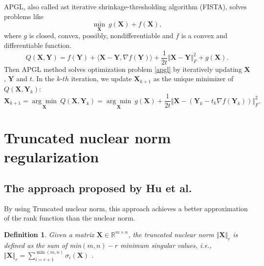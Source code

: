 \documentclass{article}
\newtheorem{definition}{Definition}[section]
\begin{document}
{APGL, also called ast iterative shrinkage-thresholding algorithm (FISTA), solves problems like
\begin{equation}
    \underset{\mathbf X}{\min} \ g(\mathbf X)+f(\mathbf X),
    \label{apgl}
\end{equation}
where $g$ is closed, convex, possibly, nondifferentiable and $f$ is a convex and differentiable function. 
\begin{equation}
    Q(\mathbf X,\mathbf Y) = f(\mathbf Y)+\langle \mathbf X - \mathbf Y, \nabla f(\mathbf Y) \rangle + \frac{1}{2t}\Vert \mathbf X - \mathbf Y \Vert_F^2 +g(\mathbf X).
\end{equation}
Then APGL method solves optimization problem \eqref{apgl} by iteratively updating $\mathbf X$, $\mathbf Y$ and $t$. In the $k$-$th$ iteration, we update $\mathbf X_{k+1}$ as the unique minimizer of $Q(\mathbf X, \mathbf Y_k)$:
\begin{equation}
    \mathbf X_{k+1} = \underset{\mathbf X}{\arg\min}\ Q(\mathbf X, \mathbf Y_k) = \underset{\mathbf X}{\arg\min}\ g(\mathbf X)+\frac{1}{2t}\Vert \mathbf X- (\mathbf Y_k -t_k \nabla f(\mathbf Y_k))\Vert_F^2.
\end{equation}


\section{Truncated nuclear norm regularization}
\label{s3}

\subsection{The approach proposed by Hu et al.}
By using Truncated nuclear norm, this approach achieves a better approximation of the rank function than the nuclear norm.
\begin{definition}
    Given a matrix $\mathbf X \in \mathbb{R}^{m \times n}$, the truncated nuclear norm $\Vert\mathbf X \Vert_r$ is defined as the sum of min$(m,n) - r$  minimum singular values, i.e., $\Vert\mathbf X \Vert_r = \sum_{i=r+1}^{\min(m,n)} \sigma_i(\mathbf X)$ .
\end{definition}

}
\end{document}
